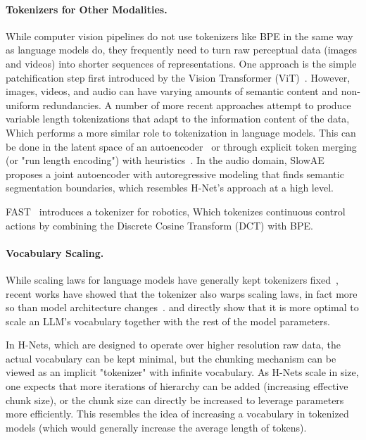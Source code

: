 \documentclass{article}
\newcommand{\citep}{\parencite}
\newcommand{\citet}{\textcite}
\theoremstyle{plain}
\theoremstyle{remark}
\begin{document}
\paragraph{Tokenizers for Other Modalities.}
While computer vision pipelines do not use tokenizers like BPE in the same way as language models do,
they frequently need to turn raw perceptual data (images and videos) into shorter sequences of representations.
One approach is the simple patchification step first introduced by the Vision Transformer (ViT)~\citep{ViT}.
However, images, videos, and audio can have varying amounts of semantic content and non-uniform redundancies.
A number of more recent approaches attempt to produce variable length tokenizations that adapt to the information content of the data,
Which performs a more similar role to tokenization in language models. 
This can be done in the latent space of an autoencoder~\citep{TiTok, ALIT}
or through explicit token merging (or "run length encoding") with heuristics~\citep{ToMe, RLT}.
In the audio domain, SlowAE~\citep{SlowAE} proposes a joint autoencoder with autoregressive modeling that finds semantic segmentation boundaries, which resembles H-Net's approach at a high level.

FAST~\citep{lin2025autoregressive} introduces a tokenizer for robotics,
Which tokenizes continuous control actions by combining the Discrete Cosine Transform (DCT) with BPE.

\paragraph{Vocabulary Scaling.}
While scaling laws for language models have generally kept tokenizers fixed~\citep{ScalingLaw,Chinchilla,Llama3},
recent works have showed that the tokenizer also warps scaling laws, in fact more so than model architecture changes~\citep{mayilvahanan2025llms}.
\citet{tao2024scaling} and \citet{huang2025over}
directly show that it is more optimal to scale an LLM's vocabulary together with the rest of the model parameters.

In H-Nets, which are designed to operate over higher resolution raw data,
the actual vocabulary can be kept minimal,
but the chunking mechanism can be viewed as an implicit "tokenizer" with infinite vocabulary.
As H-Nets scale in size, one expects that more iterations of hierarchy can be added (increasing effective chunk size), or the chunk size can directly be increased to leverage parameters more efficiently.
This resembles the idea of increasing a vocabulary in tokenized models (which would generally increase the average length of tokens).
\end{document}
